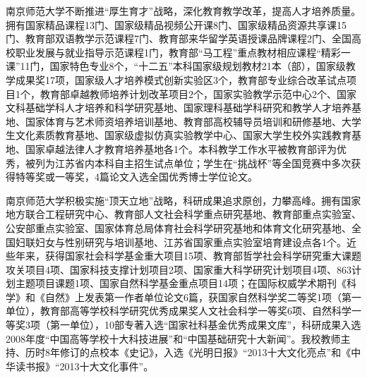 \documentclass[UTF8,a4paper,twoside,zihao=-4]{ctexrep}
\theoremstyle{nonumberplain}
\begin{document}
南京师范大学不断推进``厚生育才''战略，深化教育教学改革，提高人才培养质量。拥有国家精品课程13门、国家级精品视频公开课8门、国家级精品资源共享课15门、教育部双语教学示范课程7门、教育部来华留学英语授课品牌课程2门、全国高校职业发展与就业指导示范课程1门，教育部“马工程”重点教材相应课程“精彩一课”11门，国家特色专业8个，``十二五''本科国家级规划教材21本（部），国家级教学成果奖17项，国家级人才培养模式创新实验区3个，教育部专业综合改革试点项目1个，教育部卓越教师培养计划改革项目2个，国家实验教学示范中心2个、国家文科基础学科人才培养和科学研究基地、国家理科基础学科研究和教学人才培养基地、国家体育与艺术师资培养培训基地、教育部高校辅导员培训和研修基地、大学生文化素质教育基地、国家级虚拟仿真实验教学中心、国家大学生校外实践教育基地、国家卓越法律人才教育培养基地各1个。本科教学工作水平被教育部评为优秀，被列为江苏省内本科自主招生试点单位；学生在“挑战杯”等全国竞赛中多次获得特等奖或一等奖，4篇论文入选全国优秀博士学位论文。

南京师范大学积极实施``顶天立地''战略，科研成果追求原创，力攀高峰。拥有国家地方联合工程研究中心、教育部人文社会科学重点研究基地、教育部重点实验室、公安部重点实验室、国家体育总局体育社会科学研究基地和体育文化研究基地、全国妇联妇女与性别研究与培训基地、江苏省国家重点实验室培育建设点各1个。近些年来，获得国家社会科学基金重大项目15项、教育部哲学社会科学研究重大课题攻关项目4项、国家科技支撑计划项目2项、国家重大科学研究计划项目4项、863计划主题项目课题1项、国家自然科学基金重点项目14项；在国际权威学术期刊《科学》和《自然》上发表第一作者单位论文6篇，获国家自然科学奖二等奖1项（第一单位），教育部高等学校科学研究优秀成果奖人文社会科学一等奖6项、自然科学一等奖3项（第一单位），10部专著入选“国家社科基金优秀成果文库”，科研成果入选2008年度“中国高等学校十大科技进展”和“中国基础研究十大新闻”。我校教师主持、历时8年修订的点校本《史记》，入选《光明日报》“2013十大文化亮点”和《中华读书报》“2013十大文化事件”。
\end{document}
